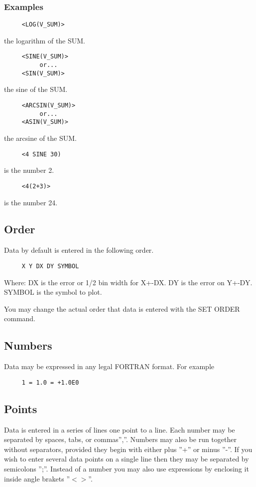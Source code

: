\subsubsection{Examples}
\begin{verbatim}
     <LOG(V_SUM)> 
\end{verbatim}
the logarithm of the SUM.  
\begin{verbatim}
     <SINE(V_SUM)> 
          or...  
     <SIN(V_SUM)> 
\end{verbatim}
the sine of the SUM.  
\begin{verbatim}
     <ARCSIN(V_SUM)> 
          or...  
     <ASIN(V_SUM)> 
\end{verbatim}
the arcsine of the SUM.  
\begin{verbatim}
     <4 SINE 30) 
\end{verbatim}
is the number 2.  
\begin{verbatim}
     <4(2+3)> 
\end{verbatim}
is the number 24.  
\subsection{Order}
Data by default is entered in the following order.  
\begin{verbatim}
     X Y DX DY SYMBOL 
\end{verbatim}

Where:  
DX is the error or 1/2 bin width for X+-DX.  
DY is the error on Y+-DY.  
SYMBOL is the symbol to plot.  

You  may  change the actual order that data is entered with the SET ORDER
command.  
\subsection{Numbers}
Data may be expressed in any legal FORTRAN format.  For example 
\begin{verbatim}
     1 = 1.0 = +1.0E0 
\end{verbatim}
\subsection{Points}
Data  is  entered  in a series of lines one point to a line.  Each number
may be separated by spaces, tabs, or commas'',''.  Numbers may also be  run
together  without separators, provided they begin with either plus ''+'' or
minus ''-''.  If you wish to enter several data points  on  a  single  line
then  they  may  be separated by semicolons '';''.  Instead of a number you
may also use expressions by enclosing it inside angle brakets ''$<$$>$''.  

